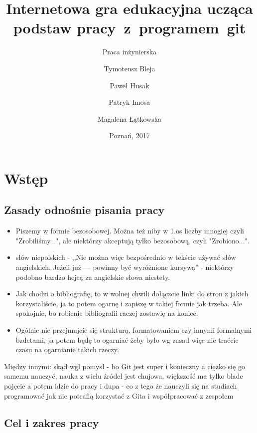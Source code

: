 \documentclass[12pt,a4paper,polish,thesis]{dcsbook}
\begin{document}
	\author{Tymoteusz Bleja \and Paweł Husak \and Patryk Imosa \and Magalena Łątkowska}
	\title{Internetowa gra edukacyjna ucząca podstaw pracy~z~programem~git}
	\subtitle{Praca inżynierska}
	\date{Poznań, 2017}
	\maketitle
	\frontmatter
	\tableofcontents{}
	\mainmatter

	\chapter{Wstęp}

	\section{Zasady odnośnie pisania pracy}

	\begin{itemize}
		\item Piszemy w formie bezosobowej. Można też niby w 1.os liczby mnogiej czyli "Zrobiliśmy...", ale niektórzy akceptują tylko bezosobową, czyli "Zrobiono...".

		\item słów niepolskich - ,,Nie można więc bezpośrednio
		w tekście używać słów angielskich. Jeżeli już — powinny być wyróżnione kursywą'' - niektórzy podobno bardzo hejcą za angielskie słowa niestety.

		\item Jak chodzi o bibliografię, to w wolnej chwili dołączcie linki do stron z jakich korzystaliście, ja to potem ogarnę i zapiszę w takiej formie jak trzeba. Ale spokojnie, bo robienie bibliografii raczej zostawię na koniec.

		\item Ogólnie nie przejmujcie się strukturą, formatowaniem czy innymi formalnymi bzdetami, ja potem będę to ogarniać żeby było wg zasad więc nie traćcie czasu na ogarnianie takich rzeczy.
	\end{itemize}

	Między innymi:
	skąd wgl pomysł - bo Git jest super i konieczny a ciężko się go samemu nauczyć, nauka z wielu źródeł jest chujowa, większość ma tylko blade pojęcie a potem idzie do pracy i dupa - co z tego że nauczyli się na studiach programować jak nie potrafią korzystać z Gita i współpracować z zespołem

	\section*{Cel i zakres pracy}
\end{document}
